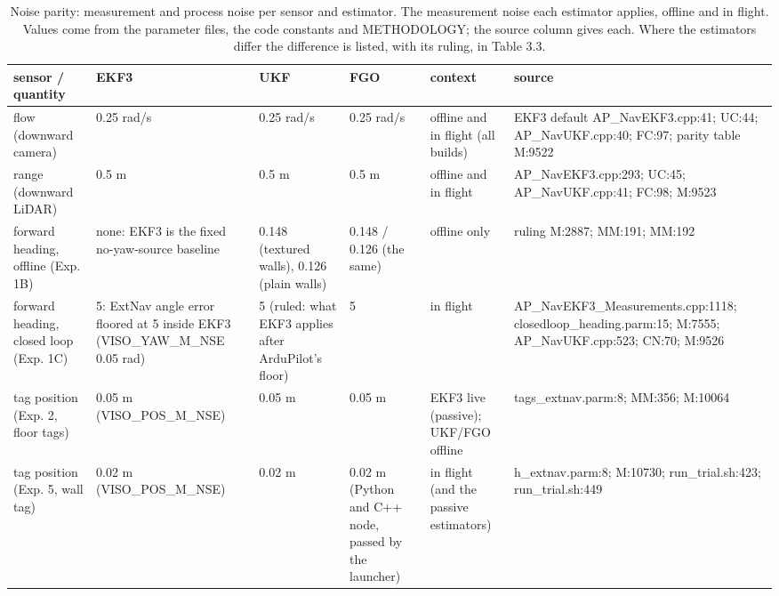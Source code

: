 \begin{table}[htbp]
\centering
\scriptsize
\caption{Noise parity: measurement and process noise per sensor and estimator. The measurement noise each estimator applies, offline and in flight. Values come from the parameter files, the code constants and METHODOLOGY; the source column gives each. Where the estimators differ the difference is listed, with its ruling, in Table 3.3.}
\label{tab:methods_noise_parity}
\begin{tabular}{p{}p{}p{}p{}p{}p{}}
\toprule
\textbf{sensor / quantity} & \textbf{EKF3} & \textbf{UKF} & \textbf{FGO} & \textbf{context} & \textbf{source} \\
\midrule
flow (downward camera) & 0.25 rad/s & 0.25 rad/s & 0.25 rad/s & offline and in flight (all builds) & EKF3 default AP\_NavEKF3.cpp:41; UC:44; AP\_NavUKF.cpp:40; FC:97; parity table M:9522 \\
range (downward LiDAR) & 0.5 m & 0.5 m & 0.5 m & offline and in flight & AP\_NavEKF3.cpp:293; UC:45; AP\_NavUKF.cpp:41; FC:98; M:9523 \\
forward heading, offline (Exp. 1B) & none: EKF3 is the fixed no-yaw-source baseline & 0.148\textdegree{} (textured walls), 0.126\textdegree{} (plain walls) & 0.148\textdegree{} / 0.126\textdegree{} (the same) & offline only & ruling M:2887; MM:191; MM:192 \\
forward heading, closed loop (Exp. 1C) & 5\textdegree{}: ExtNav angle error floored at 5\textdegree{} inside EKF3 (VISO\_YAW\_M\_NSE 0.05 rad) & 5\textdegree{} (ruled: what EKF3 applies after ArduPilot's floor) & 5\textdegree{} & in flight & AP\_NavEKF3\_Measurements.cpp:1118; closedloop\_heading.parm:15; M:7555; AP\_NavUKF.cpp:523; CN:70; M:9526 \\
tag position (Exp. 2, floor tags) & 0.05 m (VISO\_POS\_M\_NSE) & 0.05 m & 0.05 m & EKF3 live (passive); UKF/FGO offline & tags\_extnav.parm:8; MM:356; M:10064 \\
tag position (Exp. 5, wall tag) & 0.02 m (VISO\_POS\_M\_NSE) & 0.02 m & 0.02 m (Python and C++ node, passed by the launcher) & in flight (and the passive estimators) & h\_extnav.parm:8; M:10730; run\_trial.sh:423; run\_trial.sh:449 \\

\end{tabular}
\end{table}
